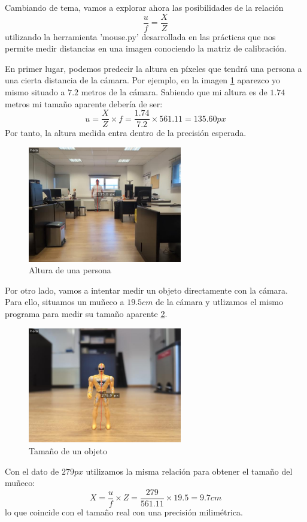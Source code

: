 \documentclass[12pt]{article}
\begin{document}
Cambiando de tema, vamos a explorar ahora las posibilidades de la relación
$$
\frac{u}{f} = \frac{X}{Z}
$$
utilizando la herramienta 'mouse.py' desarrollada en las prácticas que nos permite medir distancias en una imagen conociendo la matriz de calibración.

En primer lugar, podemos predecir la altura en píxeles que tendrá una persona a una cierta distancia de la cámara. 
Por ejemplo, en la imagen \ref{fig:altura_persona} aparezco yo mismo situado a $7.2$ metros de la cámara. Sabiendo que mi altura es de $1.74$ metros mi tamaño aparente debería de ser:
$$u=\frac{X}{Z} \times f = \frac{1.74}{7.2} \times 561.11 = 135.60 px$$
Por tanto, la altura medida entra dentro de la precisión esperada.

\begin{figure}[H]
    \centering
    \includegraphics[width=0.6\textwidth]{images_calibracion/Altura_persona.png}  
    \caption{Altura de una persona}
    \label{fig:altura_persona}
\end{figure}

Por otro lado, vamos a intentar medir un objeto directamente con la cámara.
Para ello, situamos un muñeco a $19.5cm$ de la cámara y utlizamos el mismo programa para medir su tamaño aparente \ref{fig:altura_objeto}.
\begin{figure}[H]
    \centering
    \includegraphics[width=0.6\textwidth]{images_calibracion/Altura_objeto.png}  
    \caption{Tamaño de un objeto}
    \label{fig:altura_objeto}
\end{figure}
Con el dato de $279px$ utilizamos la misma relación para obtener el tamaño del muñeco:
$$X = \frac{u}{f} \times Z= \frac{279}{561.11} \times 19.5 = 9.7 cm$$
lo que coincide con el tamaño real con una precisión milimétrica.
\end{document}

